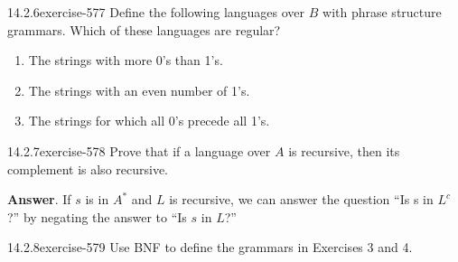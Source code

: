 \documentclass[twoside,10pt,]{book}
\numberwithin{equation}{section}
\begin{document}
\begin{divisionsolution}{14.2.6}{}{exercise-577}%
\hypertarget{p-5193}{}%
Define the following languages over \(B\) with phrase structure grammars. Which of these languages are regular?\leavevmode%
\begin{enumerate}[label=(\alph*)]
\item\hypertarget{li-2368}{}\hypertarget{p-5194}{}%
The strings with more 0's than 1's.%
\item\hypertarget{li-2369}{}\hypertarget{p-5195}{}%
The strings with an even number of 1's.%
\item\hypertarget{li-2370}{}\hypertarget{p-5196}{}%
The strings for which all 0's precede all 1's.%
\end{enumerate}
%
\end{divisionsolution}%
\begin{divisionsolution}{14.2.7}{}{exercise-578}%
\hypertarget{p-5197}{}%
Prove that if a language over \(A\) is recursive, then its complement is also recursive.%
\par\smallskip%
\noindent\textbf{Answer}.\quad%
\hypertarget{p-5198}{}%
If \(s\) is in \(A^*\) and \(L\) is recursive, we can answer the question ``Is s in \(L^c\)?''  by negating the answer to ``Is \(s\) in \(L\)?''%
\end{divisionsolution}%
\begin{divisionsolution}{14.2.8}{}{exercise-579}%
\hypertarget{p-5199}{}%
Use BNF to define the grammars in Exercises 3 and 4.%
\end{divisionsolution}%
\end{document}
